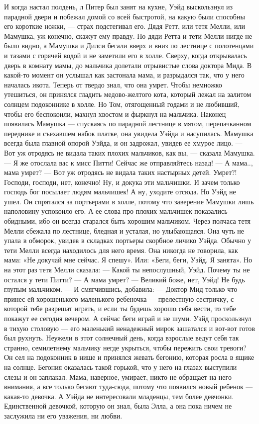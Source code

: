 И когда настал полдень, л Питер был занят на кухне, Уэйд выскользнул из парадной двери и побежал домой со всей быстротой, на какую были способны его короткие ножки, — страх подстегивал его. Дядя Ретт, или тетя Мелли, или Мамушка, уж конечно, скажут ему правду. Но дяди Ретта и тети Мелли нигде не было видно, а Мамушка и Дилси бегали вверх и вниз по лестнице с полотенцами и тазами с горячей водой и не заметили его в холле. Сверху, когда открывалась дверь в комнату мамы, до мальчика долетали отрывистые слова доктора Мида. В какой-то момент он услышал как застонала мама, и разрыдался так, что у него началась икота. Теперь от твердо знал, что она умрет. Чтобы немножко утешиться, он принялся гладить медово-желтого кота, который лежал на залитом солнцем подоконнике в холле. Но Том, отягощенный годами и не любивший, чтобы его беспокоили, махнул хвостом и фыркнул на мальчика.
Наконец появилась Мамушка — спускаясь по парадной лестнице в мятом, перепачканном переднике и съехавшем набок платке, она увидела Уэйда и насупилась. Мамушка всегда была главной опорой Уэйда, и он задрожал, увидев ее хмурое лицо.
— Вот уж отродясь не видала таких плохих мальчиков, как вы, — сказала Мамушка. — Я же отослала вас к мисс Питти! Сейчас же отправляйтесь назад!
— А мама.., мама умрет?
— Вот уж отродясь не видала таких настырных детей. Умрет?! Господи, господи, нет, конечно! Ну, и докука эти мальчишки. И зачем только господь бог посылает людям мальчишек! А ну, уходите отсюда.
Но Уэйд не ушел. Он спрятался за портьерами в холле, потому что заверение Мамушки лишь наполовину успокоило его. А ее слова про плохих мальчишек показались обидными, ибо он всегда старался быть хорошим мальчиком. Через полчаса тетя Мелли сбежала по лестнице, бледная и усталая, но улыбающаяся. Она чуть не упала в обморок, увидев в складках портьеры скорбное личико Уэйда. Обычно у тети Мелли всегда находилось для него время. Она никогда не говорила, как мама: «Не докучай мне сейчас. Я спешу». Или: «Беги, беги, Уэйд. Я занята».
Но на этот раз тетя Мелли сказала:
— Какой ты непослушный, Уэйд. Почему ты не остался у тети Питти?
— А мама умрет?
— Великий боже, нет, Уэйд! Не будь глупым мальчиком. — И смягчившись, добавила: — Доктор Мид только что принес ей хорошенького маленького ребеночка — прелестную сестричку, с которой тебе разрешат играть, и если ты будешь хорошо себя вести, то тебе покажут ее сегодня вечером. А сейчас беги играй и не шуми.
Уэйд проскользнул в тихую столовую — его маленький ненадежный мирок зашатался и вот-вот готов был рухнуть. Неужели в этот солнечный день, когда взрослые ведут себя так странно, семилетнему мальчику негде укрыться, чтобы пережить свои тревоги? Он сел на подоконник в нише и принялся жевать бегонию, которая росла в ящике на солнце. Бегония оказалась такой горькой, что у него на глазах выступили слезы и он заплакал. Мама, наверное, умирает, никто не обращает на него внимания, а все только бегают туда-сюда, потому что появился новый ребенок — какая-то девочка. А Уэйда не интересовали младенцы, тем более девчонки. Единственной девочкой, которую он знал, была Элла, а она пока ничем не заслужила ни его уважения, ни любви.
